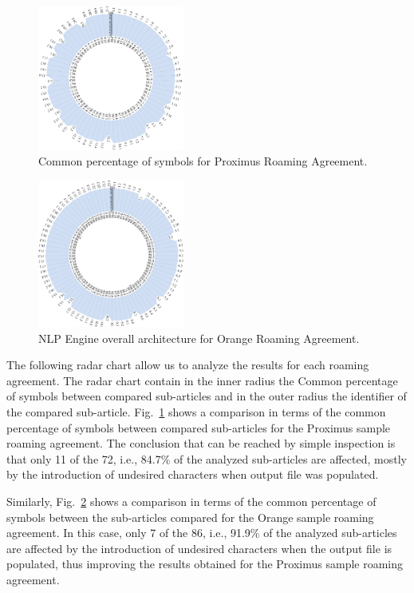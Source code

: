 \begin{figure}[htbp]
\centerline{\includegraphics[width=0.43\textwidth]{images/Proximus.png}}
\caption{Common percentage of symbols for Proximus Roaming Agreement.}
\label{fig3}
\end{figure}

\begin{figure}[htbp]
\centerline{\includegraphics[width=0.43\textwidth]{images/Orange.png}}
\caption{NLP Engine overall architecture for Orange Roaming Agreement.}
\label{fig4}
\end{figure}

The following radar chart allow us to analyze the results for each roaming agreement. The radar chart contain in the inner radius the Common percentage of symbols between compared sub-articles and in the outer radius the identifier of the compared sub-article. Fig.~\ref{fig3} shows a comparison in terms of the common percentage of symbols between compared sub-articles for the Proximus sample roaming agreement. The conclusion that can be reached by simple inspection is that only 11 of the 72, i.e.,  84.7\% of the analyzed sub-articles are affected, mostly by the introduction of undesired characters when output file was populated.

Similarly, Fig.~\ref{fig4} shows a comparison in terms of the common percentage of symbols between the sub-articles compared for the Orange sample roaming agreement. In this case, only 7 of the 86, i.e., 91.9\% of the analyzed sub-articles are affected by the introduction of undesired characters when the output file is populated, thus improving the results obtained for the Proximus sample roaming agreement.
